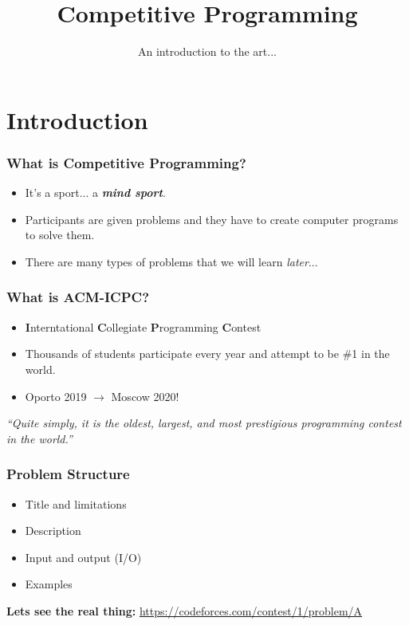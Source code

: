 \documentclass{beamer}
\begin{document}
\title{Competitive Programming}
\subtitle{An introduction to the art...}

\maketitle

\section{Introduction}

\begin{frame}
    \frametitle{What is Competitive Programming?}

    \begin{itemize}
        \item It's a sport... a \textbf{\textit{mind sport}}.
        \item Participants are given problems and they have to create computer programs to solve them.
        \item There are many types of problems that we will learn \textit{later}...
    \end{itemize}
\end{frame}

\begin{frame}
    \frametitle{What is ACM-ICPC?}

    \begin{itemize}
        \item \textbf{I}nterntational \textbf{C}ollegiate \textbf{P}rogramming \textbf{C}ontest
        \item Thousands of students participate every year and attempt to be \#1 in the world.
        \item Oporto 2019 $\rightarrow$ Moscow 2020!
    \end{itemize}

    \begin{center}
        \textit{``Quite simply, it is the oldest, largest, and most prestigious programming contest in the world.''}
    \end{center}
\end{frame}

\begin{frame}
    \frametitle{Problem Structure}

    \begin{itemize}
        \item Title and limitations
        \item Description
        \item Input and output (I/O)
        \item Examples
    \end{itemize}

    \textbf{Lets see the real thing:}
    \url{https://codeforces.com/contest/1/problem/A}
\end{frame}
\end{document}
